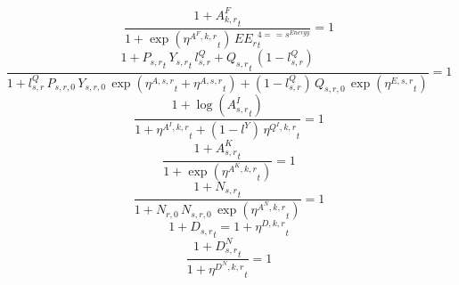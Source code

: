 \noindent[name= `sector TFP final demand 4 1']
\begin{dmath}
\frac{1+{{A^{F}_{k,r}}}_{t}}{1+\exp\left({{\eta^{A^F,k,r}}}_{t}\right)\, {{EE_r}}_{t}^{4=={{s^{Energy}}}}}=1
\end{dmath}
\noindent[name= `sector TFP 5 1']
\begin{dmath}
\frac{1+{{P_{s,r}}}_{t}\, {{Y_{s,r}}}_{t}\, {{l^{Q}_{s,r}}}+{{Q_{s,r}}}_{t}\, \left(1-{{l^{Q}_{s,r}}}\right)}{1+{{l^{Q}_{s,r}}}\, {{P_{s,r,0}}}\, {{Y_{s,r,0}}}\, \exp\left({{\eta^{A,s,r}}}_{t}+{{\eta^{A,s,r}}}_{t}\right)+\left(1-{{l^{Q}_{s,r}}}\right)\, {{Q_{s,r,0}}}\, \exp\left({{\eta^{E,s,r}}}_{t}\right)}=1
\end{dmath}
\noindent[name= `intermediate input productivity 5 1']
\begin{dmath}
\frac{1+\log\left({{A^{I}_{s,r}}}_{t}\right)}{1+{{\eta^{A^{I},k,r}}}_{t}+\left(1-{{l^{Y}}}\right)\, {{\eta^{Q^{I},k,r}}}_{t}}=1
\end{dmath}
\noindent[name= `capital productivity shock 5 1']
\begin{dmath}
\frac{1+{{A^{K}_{s,r}}}_{t}}{1+\exp\left({{\eta^{A^{K},k,r}}}_{t}\right)}=1
\end{dmath}
\noindent[name= `exogenous labour input 5 1']
\begin{dmath}
\frac{1+{{N_{s,r}}}_{t}}{1+{{N_{r,0}}}\, {{N_{s,r,0}}}\, \exp\left({{\eta^{A^{N},k,r}}}_{t}\right)}=1
\end{dmath}
\noindent[name= `TFP damage 5 1']
\begin{dmath}
1+{{D_{s,r}}}_{t}=1+{{\eta^{D,k,r}}}_{t}
\end{dmath}
\noindent[name= `labour damage 5 1']
\begin{dmath}
\frac{1+{{D^N_{s,r}}}_{t}}{1+{{\eta^{D^{N},k,r}}}_{t}}=1
\end{dmath}
\noindent[name= `capital damage 5 1']
